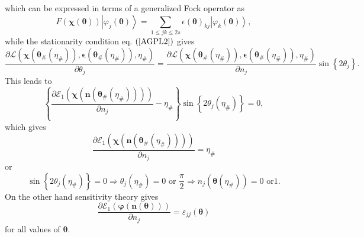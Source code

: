 \documentclass[aps,preprint]{revtex4}%
\begin{document}
which can be expressed \cite{WeinerOrtiz05} in terms of a generalized Fock
operator as
\begin{equation}
F\left(  \boldsymbol{\chi\left(  \boldsymbol{\theta}\right)  }\right)
\left\vert \varphi_{j}\boldsymbol{\left(  \boldsymbol{\theta}\right)
}\right\rangle =\sum_{1\leq jk\leq2s}\epsilon\boldsymbol{\left(
\boldsymbol{\theta}\right)  }_{kj}\left\vert \varphi_{k}\boldsymbol{\left(
\boldsymbol{\theta}\right)  }\right\rangle ,
\end{equation}
while the stationarity condition eq. $\left(  \ref{AGPL2}\right)  $ gives
\begin{equation}
\frac{\partial\mathcal{L}\left(  \boldsymbol{\chi}\left(  \boldsymbol{\theta
}_{\#}\left(  \eta_{\#}\right)  \right)  ,\boldsymbol{\epsilon}\left(
\boldsymbol{\theta}_{\#}\left(  \eta_{\#}\right)  \right)  \boldsymbol{,}%
\eta_{\#}\right)  }{\partial\theta_{j}}=\frac{\partial\mathcal{L}\left(
\boldsymbol{\chi}\left(  \boldsymbol{\theta}_{\#}\left(  \eta_{\#}\right)
\right)  ,\boldsymbol{\epsilon}\left(  \boldsymbol{\theta}_{\#}\left(
\eta_{\#}\right)  \right)  \boldsymbol{,}\eta_{\#}\right)  }{\partial n_{j}%
}\sin\left\{  2\theta_{j}\right\}  .
\end{equation}
This leads to
\begin{equation}
\left\{  \frac{\partial\mathcal{E}_{1}\left(  \boldsymbol{\chi}\left(
\boldsymbol{n}\left(  \boldsymbol{\theta}_{\#}\left(  \eta_{\#}\right)
\right)  \right)  \right)  }{\partial n_{j}}-\eta_{\#}\right\}  \sin\left\{
2\theta_{j}\left(  \eta_{\#}\right)  \right\}  =0,
\end{equation}
which gives
\begin{equation}
\frac{\partial\mathcal{E}_{1}\left(  \boldsymbol{\chi}\left(  \boldsymbol{n}%
\left(  \boldsymbol{\theta}_{\#}\left(  \eta_{\#}\right)  \right)  \right)
\right)  }{\partial n_{j}}=\eta_{\#}%
\end{equation}
or
\begin{equation}
\sin\left\{  2\theta_{j}\left(  \eta_{\#}\right)  \right\}  =0\Rightarrow
\theta_{j}\left(  \eta_{\#}\right)  =0\text{ or }\frac{\pi}{2}\Rightarrow
n_{j}\left(  \boldsymbol{\theta}\left(  \eta_{\#}\right)  \right)  =0\text{ or
}1.
\end{equation}
On the other hand sensitivity theory gives%
\begin{equation}
\frac{\partial\mathcal{E}_{1}\left(  \boldsymbol{\varphi}\left(
\boldsymbol{n}\left(  \boldsymbol{\theta}\right)  \right)  \right)  }{\partial
n_{j}}=\varepsilon_{jj}\boldsymbol{\left(  \boldsymbol{\theta}\right)  }%
\end{equation}
for all values of $\boldsymbol{\theta.}$
\end{document}
